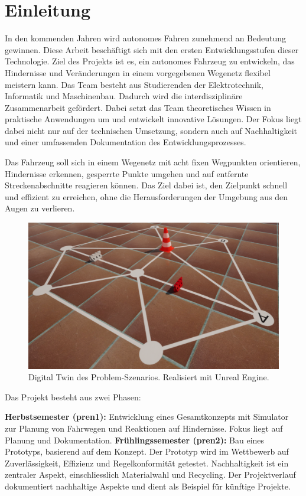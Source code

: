 \documentclass[../main.tex]{subfiles}
\begin{document}
\newpage
\section{Einleitung}

In den kommenden Jahren wird autonomes Fahren zunehmend an Bedeutung gewinnen. Diese Arbeit beschäftigt sich mit den ersten Entwicklungsstufen dieser Technologie. Ziel des Projekts ist es, ein autonomes Fahrzeug zu entwickeln, das Hindernisse und Veränderungen in einem vorgegebenen Wegenetz flexibel meistern kann. Das Team besteht aus Studierenden der Elektrotechnik, Informatik und Maschinenbau. Dadurch wird die interdisziplinäre Zusammenarbeit gefördert. Dabei setzt das Team theoretisches Wissen in praktische Anwendungen um und entwickelt innovative Lösungen. Der Fokus liegt dabei nicht nur auf der technischen Umsetzung, sondern auch auf Nachhaltigkeit und einer umfassenden Dokumentation des Entwicklungsprozesses.

Das Fahrzeug soll sich in einem Wegenetz mit acht fixen Wegpunkten orientieren, Hindernisse erkennen, gesperrte Punkte umgehen und auf entfernte Streckenabschnitte reagieren können. Das Ziel dabei ist, den Zielpunkt schnell und effizient zu erreichen, ohne die Herausforderungen der Umgebung aus den Augen zu verlieren.
\begin{figure}[H]
    \centering
    \includegraphics[width=0.75\linewidth]{img/unrealengine/unreal.png}
    \caption{Digital Twin des Problem-Szenarios. Realisiert mit Unreal Engine\protect\footnotemark.}
    \label{intro_digital_twin}
\end{figure}
Das Projekt besteht aus zwei Phasen:

\textbf{Herbstsemester (\acrshort{pren1}):} Entwicklung eines Gesamtkonzepts mit Simulator zur Planung von Fahrwegen und Reaktionen auf Hindernisse. Fokus liegt auf Planung und Dokumentation.
\textbf{Frühlingssemester (\acrshort{pren2}):} Bau eines Prototyps, basierend auf dem Konzept. Der Prototyp wird im Wettbewerb auf Zuverlässigkeit, Effizienz und Regelkonformität getestet.
Nachhaltigkeit ist ein zentraler Aspekt, einschliesslich Materialwahl und Recycling. Der Projektverlauf dokumentiert nachhaltige Aspekte und dient als Beispiel für künftige Projekte.
\end{document}
